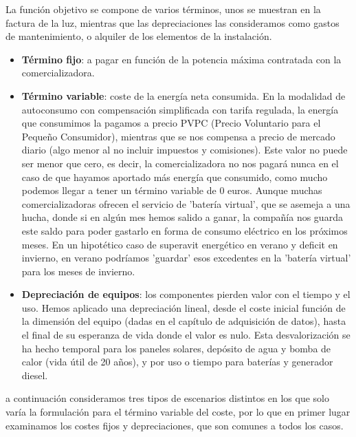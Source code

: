 La función objetivo se compone de varios términos, unos se muestran en la
factura de la luz, mientras que las depreciaciones las consideramos como gastos
de mantenimiento, o alquiler de los elementos de la instalación.

\begin{itemize}
	\item \textbf{Término fijo}: a pagar en función de la potencia máxima
	      contratada con la comercializadora.

	\item \textbf{Término variable}: coste de la energía neta consumida. En la
	      modalidad de autoconsumo con compensación simplificada con tarifa regulada,
	      la energía que consumimos la pagamos a precio PVPC (Precio Voluntario para el
	      Pequeño Consumidor), mientras que se nos compensa a precio de mercado diario
	      (algo menor al no incluir impuestos y comisiones). Este valor no puede ser
	      menor que cero, es decir, la comercializadora no nos pagará nunca en el caso
	      de que hayamos aportado más energía que consumido, como mucho podemos llegar
	      a tener un término variable de 0 euros. Aunque muchas comercializadoras
	      ofrecen el servicio de 'batería virtual', que se asemeja a una hucha, donde
	      si en algún mes hemos salido a ganar, la compañía nos guarda este saldo para
	      poder gastarlo en forma de consumo eléctrico en los próximos meses. En un
	      hipotético caso de superavit energético en verano y deficit en invierno, en
	      verano podríamos 'guardar' esos excedentes en la 'batería virtual' para los
	      meses de invierno.

	\item \textbf{Depreciación de equipos}: los componentes pierden valor con el
	      tiempo y el uso. Hemos aplicado una depreciación lineal, desde el coste
	      inicial función de la dimensión del equipo (dadas en el capítulo de
	      adquisición de datos), hasta el final de su esperanza de vida donde el valor
	      es nulo. Esta desvalorización se ha hecho temporal para los paneles
	      solares, depósito de agua y bomba de calor (vida útil de 20 años), y por
	      uso o tiempo para baterías y generador diesel.
\end{itemize}

a continuación consideramos tres tipos de escenarios distintos en los que solo
varía la formulación para el término variable del coste, por lo que en primer
lugar examinamos los costes fijos y depreciaciones, que son comunes a todos los
casos.

